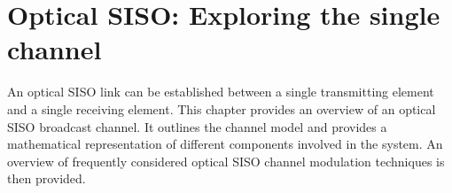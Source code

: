 \chapter{Optical SISO: Exploring the single channel}
\label{chapter:siso}
\thispagestyle{myheadings}
An optical SISO link can be established between a single transmitting element and a single receiving element. This chapter provides an overview of an optical SISO broadcast channel. It outlines the channel model and provides a mathematical representation of different components involved in the system. An overview of frequently considered optical SISO channel modulation techniques is then provided. 





